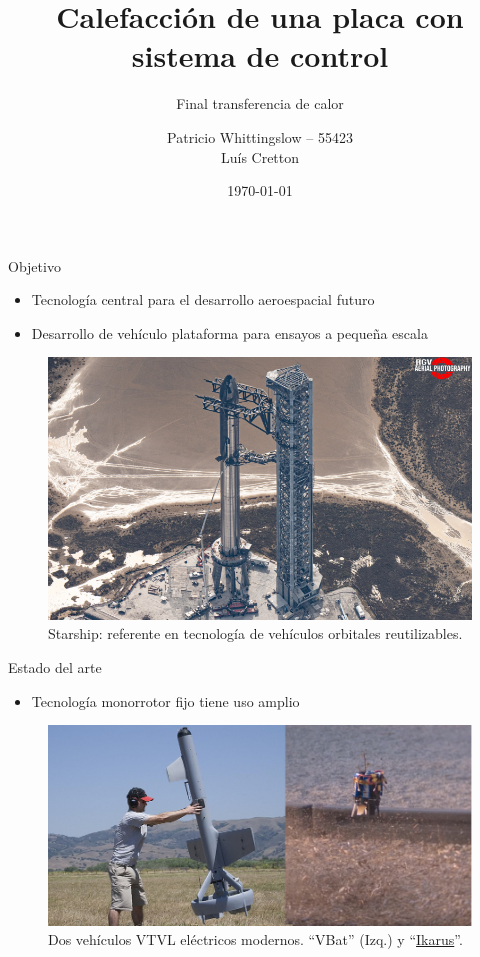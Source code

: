 \documentclass[10pt]{beamer}
\title{Calefacción de una placa con sistema de control}
\subtitle{Final transferencia de calor }
\date{\today}
\author{Patricio Whittingslow -- 55423 \\ Luís Cretton}
\begin{document}


\begin{frame}{Objetivo}
    \begin{itemize}
        \item Tecnología central para el desarrollo aeroespacial futuro
        \item Desarrollo de vehículo plataforma para ensayos a pequeña escala
    \end{itemize}

    \hspace{0.7cm}
    \begin{figure}[htb]
        \centering
        \includegraphics[width=0.8\linewidth]{fig/starship.png}
        \caption{Starship: referente en tecnología de vehículos orbitales reutilizables.}
        \label{fig:starship}
    \end{figure}
\end{frame}

\begin{frame}{Estado del arte}
    \begin{itemize}
        \item Tecnología monorrotor fijo tiene uso amplio
    \end{itemize}

    \begin{figure}[htb]
        \centering
        \includegraphics[width=0.8\linewidth]{fig/vbat_icarus.png}
        \caption{Dos vehículos VTVL eléctricos modernos. ``VBat'' (Izq.) y ``\href{https://hackaday.com/2018/08/31/single-rotor-drone-a-thrust-vectoring-monocopter/}{Ikarus}''.}
        \label{fig:vbat_icarus}
    \end{figure}
\end{frame}
\end{document}
